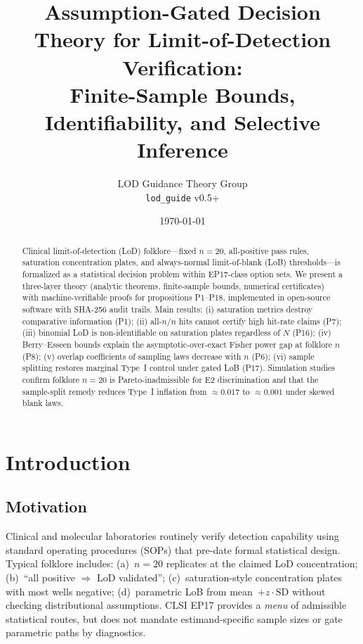 \documentclass[11pt,a4paper]{article}
\title{Assumption-Gated Decision Theory for Limit-of-Detection Verification:\\
Finite-Sample Bounds, Identifiability, and Selective Inference}
\author{LOD Guidance Theory Group\\ \texttt{lod\_guide} v0.5+}
\date{\today}
\theoremstyle{definition}
\begin{document}
\maketitle

\begin{abstract}
Clinical limit-of-detection (LoD) folklore---fixed $n=20$, all-positive pass rules,
saturation concentration plates, and always-normal limit-of-blank (LoB) thresholds---is
formalized as a statistical decision problem within EP17-class option sets.
We present a three-layer theory (analytic theorems, finite-sample bounds, numerical
certificates) with machine-verifiable proofs for propositions P1--P18, implemented in
open-source software with SHA-256 audit trails.
Main results: (i) saturation metrics destroy comparative information (P1);
(ii) all-$n/n$ hits cannot certify high hit-rate claims (P7);
(iii) binomial LoD is non-identifiable on saturation plates regardless of $N$ (P16);
(iv) Berry--Esseen bounds explain the asymptotic-over-exact Fisher power gap at folklore $n$ (P8);
(v) overlap coefficients of sampling laws decrease with $n$ (P6);
(vi) sample splitting restores marginal Type~I control under gated LoB (P17).
Simulation studies confirm folklore $n=20$ is Pareto-inadmissible for E2 discrimination
and that the sample-split remedy reduces Type~I inflation from $\approx 0.017$ to $\approx 0.001$
under skewed blank laws.
\end{abstract}

\section{Introduction}

\subsection{Motivation}

Clinical and molecular laboratories routinely verify detection capability using
standard operating procedures (SOPs) that pre-date formal statistical design.
Typical folklore includes: (a)~$n=20$ replicates at the claimed LoD concentration;
(b)~``all positive $\Rightarrow$ LoD validated''; (c)~saturation-style concentration
plates with most wells negative; (d)~parametric LoB from mean~$+ z \cdot \text{SD}$
without checking distributional assumptions.
CLSI EP17 provides a \emph{menu} of admissible statistical routes, but does not
mandate estimand-specific sample sizes or gate parametric paths by diagnostics.
\end{document}
